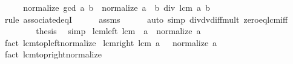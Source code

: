 \begin{isabellebody}
\ \ \isamarkupfalse%
\ \isamarkupfalse%
\ {\isachardoublequoteopen}normalize\ {\isacharparenleft}{\kern0pt}gcd\ a\ b{\isacharparenright}{\kern0pt}\ {\isacharequal}{\kern0pt}\ normalize\ {\isacharparenleft}{\kern0pt}a\ {\isacharasterisk}{\kern0pt}\ b\ div\ lcm\ a\ b{\isacharparenright}{\kern0pt}{\isachardoublequoteclose}\isanewline
\ \ \ \ \isamarkupfalse%
\ {\isacharminus}{\kern0pt}\isanewline
\ \ \ \ \isamarkupfalse%
\ {\isacharparenleft}{\kern0pt}rule\ associated{\isacharunderscore}{\kern0pt}eqI{\isacharparenright}{\kern0pt}\isanewline
\ \ \ \ \isamarkupfalse%
\ assms\isanewline
\ \ \ \ \isamarkupfalse%
\ {\isacharparenleft}{\kern0pt}auto\ simp{\isacharcolon}{\kern0pt}\ div{\isacharunderscore}{\kern0pt}dvd{\isacharunderscore}{\kern0pt}iff{\isacharunderscore}{\kern0pt}mult\ zero{\isacharunderscore}{\kern0pt}eq{\isacharunderscore}{\kern0pt}lcm{\isacharunderscore}{\kern0pt}iff{\isacharparenright}{\kern0pt}\isanewline
\ \ \ \ \isamarkupfalse%
\isanewline
\ \ \isamarkupfalse%
\ {\isacharquery}{\kern0pt}thesis\ \isamarkupfalse%
\ simp\isanewline
{}\isamarkupfalse%
%
\endisatagproof
{\isafoldproof}%
%
\isadelimproof
\isanewline
%
\endisadelimproof
\isanewline
{}\isamarkupfalse%
\ lcm{\isacharunderscore}{\kern0pt}{}{\isacharunderscore}{\kern0pt}left{\isacharcolon}{\kern0pt}\ {\isachardoublequoteopen}lcm\ {}\ a\ {\isacharequal}{\kern0pt}\ normalize\ a{\isachardoublequoteclose}\isanewline
%
\isadelimproof
\ \ %
\endisadelimproof
%
\isatagproof
{}\isamarkupfalse%
\ {\isacharparenleft}{\kern0pt}fact\ lcm{\isachardot}{\kern0pt}top{\isacharunderscore}{\kern0pt}left{\isacharunderscore}{\kern0pt}normalize{\isacharparenright}{\kern0pt}%
\endisatagproof
{\isafoldproof}%
%
\isadelimproof
\isanewline
%
\endisadelimproof
\isanewline
{}\isamarkupfalse%
\ lcm{\isacharunderscore}{\kern0pt}{}{\isacharunderscore}{\kern0pt}right{\isacharcolon}{\kern0pt}\ {\isachardoublequoteopen}lcm\ a\ {}\ {\isacharequal}{\kern0pt}\ normalize\ a{\isachardoublequoteclose}\isanewline
%
\isadelimproof
\ \ %
\endisadelimproof
%
\isatagproof
{}\isamarkupfalse%
\ {\isacharparenleft}{\kern0pt}fact\ lcm{\isachardot}{\kern0pt}top{\isacharunderscore}{\kern0pt}right{\isacharunderscore}{\kern0pt}normalize{\isacharparenright}{\kern0pt}%
\endisatagproof
{\isafoldproof}%
%
\isadelimproof
\isanewline
%
\endisadelimproof
\isanewline
{}\isamarkupfalse%

\end{isabellebody}
